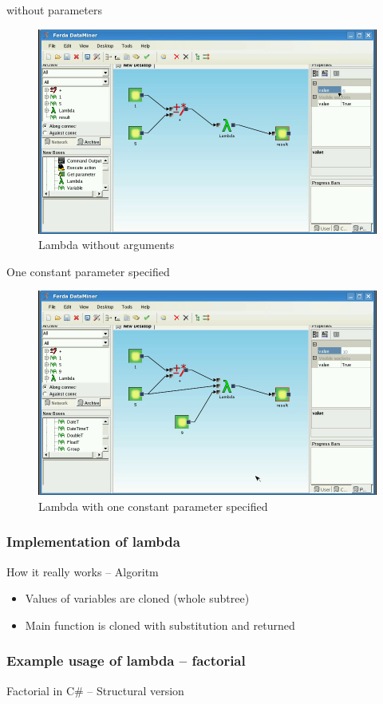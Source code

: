 \documentclass[a4paper,12pt]{book}
\begin{document}
without parameters
\begin{figure}
\includegraphics[width=12cm]{lambdaBasic2.png}
	\caption{Lambda without arguments}
\end{figure}

One constant parameter specified
\begin{figure}
\includegraphics[width=12cm]{lambdaBasic3.png}
	\caption{Lambda with one constant parameter specified}
\end{figure}
	
\subsubsection{Implementation of lambda}
How it really works -- Algoritm
\begin{itemize}
	\item Values of variables are cloned (whole subtree)
	\item Main function is cloned with substitution and returned
\end{itemize}

\subsubsection{Example usage of lambda -- factorial}
Factorial in C\# -- Structural version
\end{document}
